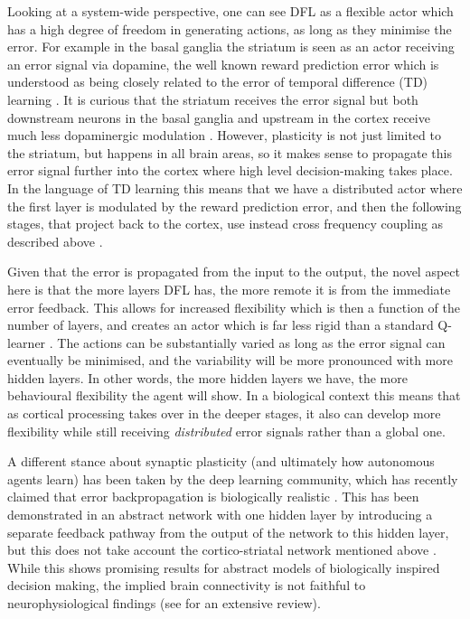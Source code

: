 \documentclass{article}
\begin{document}
Looking at a system-wide perspective, one can see DFL as a flexible
actor which has a high degree of freedom in generating actions, as long as they
minimise the error. For example in the basal ganglia the striatum is
seen as an actor receiving an error signal via dopamine, the well known
reward prediction error \cite{Schultz97} which is understood as being
closely related to the error of temporal difference (TD) learning
\cite{gurney98:_basal_gangl_action_selec_devic}. It is curious that
the striatum receives the error signal but both downstream neurons in
the basal ganglia and upstream in the cortex receive much less
dopaminergic modulation \cite{Beckstead1979}. However, plasticity is
not just limited to the striatum, but happens in all brain areas, so
it makes sense to propagate this error signal further into the cortex
\cite{Groenewegen1993} where high level decision-making takes place.
In the language of TD learning \cite{Sutton87} this means that we
have a distributed actor where the first layer is modulated by the
reward prediction error, and then the following stages, that project
back to the cortex, use instead cross frequency coupling
as described above \cite{Lipski2017}.

Given that the error is propagated from the input to the output, the
novel aspect here is that the more layers DFL has, the more remote it
is from the immediate error feedback. This allows for increased
flexibility which is then a function of the number of layers, and
creates an actor which is far less rigid than a standard Q-learner
\cite{Dayan1992}. The actions can be substantially varied as long as
the error signal can eventually be minimised, and the variability will
be more pronounced with more hidden layers. In other words, the more
hidden layers we have, the more behavioural flexibility the agent will
show. In a biological context this means that as cortical processing
takes over in the deeper stages, it also can develop more flexibility
while still receiving \textsl{distributed} error signals rather than a
global one.

A different stance about synaptic plasticity (and ultimately how
autonomous agents learn) has been taken by the deep learning
community, which has recently claimed that error backpropagation is
biologically realistic \cite{Lillicrap2016,Roelfsema2018}. This has
been demonstrated in an abstract network with one hidden layer by
introducing a separate feedback pathway from the output of the network
to this hidden layer, but this does not take account the
cortico-striatal network mentioned above \cite{haber95}. While this
shows promising results for abstract models of biologically inspired
decision making, the implied brain connectivity is not faithful to
neurophysiological findings (see \cite{berthoud04} for an extensive
review).
\end{document}
